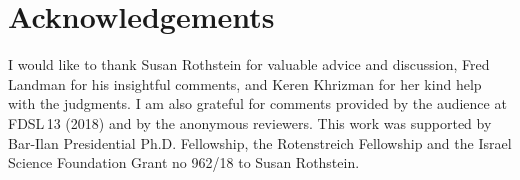 \documentclass[output=paper,
colorlinks,
citecolor=brown,
newtxmath
]{langscibook}
\begin{document}
\section*{Acknowledgements}
I would like to thank Susan Rothstein for valuable advice and discussion, Fred Landman for his insightful comments, and Keren Khrizman for her kind help with the judgments. I am also grateful for comments provided by the audience at FDSL\,13 (2018) and by the anonymous reviewers. This work was supported by Bar-Ilan Presidential Ph.D. Fellowship, the Rotenstreich Fellowship and the Israel Science Foundation Grant no 962/18 to Susan Rothstein.  

{\sloppy\printbibliography[heading=subbibliography,notkeyword=this]}
\end{document}
